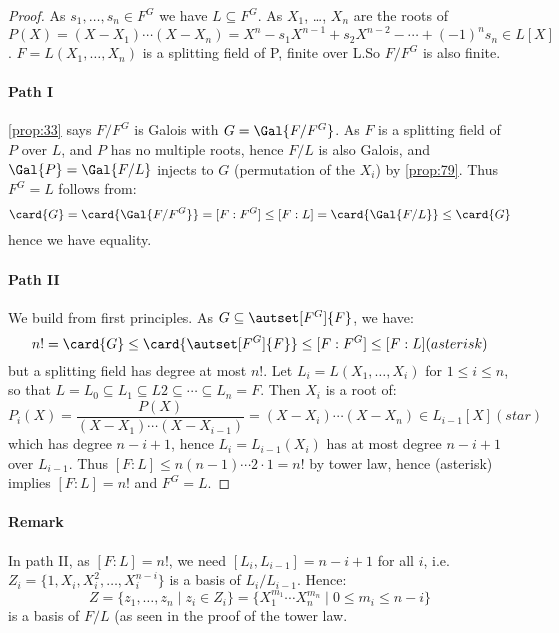\begin{proof}
  As $s_1, \ldots, s_n \in F^G$ we have $L \subseteq F^G$. As $X_1$, \ldots, $X_n$ are the roots of $P(X) = (X-X_1)\cdots{}(X-X_n) = X^n-s_1X^{n-1}+s_2X^{n-2}-\cdots{}+(-1)^ns_n \in L[X]$. $F = L(X_1, \ldots, X_n)$ is a splitting field of P, finite over L.So $F/F^G$ is also finite.

\paragraph{Path I}
 \autoref{prop:33} says $F/F^G$ is Galois with $G = \Gal{F/F^G}$. As $F$ is a splitting field of $P$ over $L$, and $P$ has no multiple roots, hence $F/L$ is also Galois, and $\Gal{P} = \Gal{F/L}$ injects to $G$ (permutation of the $X_i$) by \autoref{prop:79}. Thus $F^G = L$ follows from:
\[
\card{G} = \card{\Gal{F/F^G}} = [F : F^G] \leq [F : L] = \card{\Gal{F/L}} \leq \card{G}
\]
hence we have equality.

\paragraph{Path II}

We build from first principles. As $G \subseteq \autset[F^G]{F}$, we have:
\[
n! = \card{G} \leq \card{\autset[F^G]{F}} \leq [F : F^G] \leq [F : L] (asterisk)
\]
but a splitting field has degree at most $n!$. Let $L_i = L(X_1, \ldots, X_i)$ for $1 \leq i \leq n$, so that $L = L_0 \subseteq L_1 \subseteq L2 \subseteq \cdots \subseteq L_n = F$. Then $X_i$ is a root of:
\[
P_i(X) = \frac{P(X)}{(X-X_1)\cdots{}(X-X_{i-1})} = (X-X_i)\cdots{}(X-X_n) \in L_{i-1}[X] (star)
\]
which has degree $n-i+1$, hence $L_i = L_{i-1}(X_i)$ has at most degree $n-i+1$ over $L_{i-1}$. Thus $[F : L] \leq n(n-1)\cdots{}2\cdot{}1 = n!$ by tower law, hence (asterisk) implies $[F : L] = n!$ and $F^G = L$.
\end{proof}

\paragraph{Remark}

In path II, as $[F : L] = n!$, we need $[L_i, L_{i-1}] = n - i + 1$ for all $i$, i.e. $Z_i = \{ 1, X_i, X_i^2, \ldots, X_i^{n-i} \}$ is a basis of $L_i/L_{i-1}$. Hence:
\[
Z = \{ z_1, \ldots, z_n \mid z_i \in Z_i \} = \{ X_1^{m_1}\cdots{}X_n^{m_n} \mid 0 \leq m_i \leq n-i \}
\]
is a basis of $F/L$ (as seen in the proof of the tower law.

